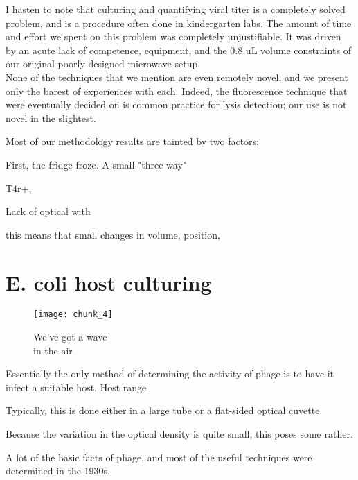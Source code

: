 \documentclass[paper.tex]{subfiles}
\begin{document}
\begin{autem}
	I hasten to note that culturing and quantifying viral titer is a completely solved problem, and is a procedure often done in kindergarten labs. The amount of time and effort we spent on this problem was completely unjustifiable. It was driven by an acute lack of competence, equipment, and the 0.8 uL volume constraints of our original poorly designed microwave setup.\\
	
	None of the techniques that we mention are even remotely novel, and we present only the barest of experiences with each.
	Indeed, the fluorescence technique that were eventually decided on is common practice for lysis detection; our use is not novel in the slightest.
\end{autem}


Most of our methodology results are tainted by two factors:

First, the fridge froze. A small "three-way" 

T4r+,


Lack of optical with

this means that small changes in volume, position, 


\section{E. coli host culturing}

\begin{figure}[H]
	\captionsetup{singlelinecheck = false, justification=justified}
	\centering
	\texttt{[image: chunk\_4]}
	\caption{
		We've got a wave\\
		in the air}
\end{figure}

Essentially the only method of determining the activity of phage is to have it infect a suitable host. Host range

Typically, this is done either in a large tube or a flat-sided optical cuvette.

Because the variation in the optical density is quite small, this poses some rather. 

A lot of the basic facts of phage, and most of the useful techniques were determined in the 1930s. 
\end{document}
